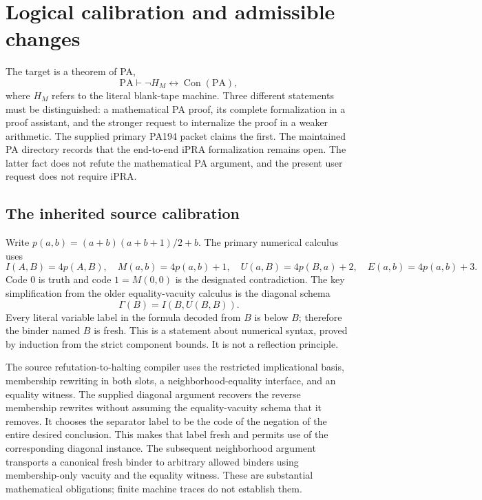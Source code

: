 \section{Logical calibration and admissible changes}
\label{sec:theory-audit}

The target is a theorem of PA,
\[
 \mathrm{PA}\vdash \neg H_M\leftrightarrow\operatorname{Con}(\mathrm{PA}),
\]
where $H_M$ refers to the literal blank-tape machine. Three different
statements must be distinguished: a mathematical PA proof, its complete
formalization in a proof assistant, and the stronger request to internalize
the proof in a weaker arithmetic. The supplied primary PA194 packet claims
the first. The maintained PA directory records that the end-to-end iPRA
formalization remains open. The latter fact does not refute the mathematical
PA argument, and the present user request does not require iPRA.

\subsection{The inherited source calibration}

Write $p(a,b)=(a+b)(a+b+1)/2+b$. The primary numerical calculus uses
\[
 I(A,B)=4p(A,B),\quad M(a,b)=4p(a,b)+1,\quad
 U(a,B)=4p(B,a)+2,\quad E(a,b)=4p(a,b)+3.
\]
Code $0$ is truth and code $1=M(0,0)$ is the designated contradiction.
The key simplification from the older equality-vacuity calculus is the
diagonal schema
\[
 \Gamma(B)=I(B,U(B,B)).
\]
Every literal variable label in the formula decoded from $B$ is below $B$;
therefore the binder named $B$ is fresh. This is a statement about numerical
syntax, proved by induction from the strict component bounds. It is not a
reflection principle.

The source refutation-to-halting compiler uses the restricted implicational
basis, membership rewriting in both slots, a neighborhood-equality
interface, and an equality witness. The supplied diagonal argument recovers
the reverse membership rewrites without assuming the equality-vacuity
schema that it removes. It chooses the separator label to be the code of
the negation of the entire desired conclusion. This makes that label fresh
and permits use of the corresponding diagonal instance. The subsequent
neighborhood argument transports a canonical fresh binder to arbitrary
allowed binders using membership-only vacuity and the equality witness.
These are substantial mathematical obligations; finite machine traces do
not establish them.


